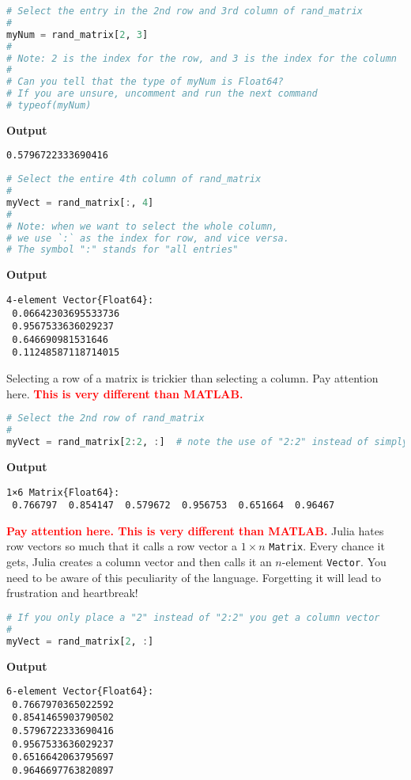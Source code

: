 \begin{lstlisting}[language=Julia,style=mystyle]
# Select the entry in the 2nd row and 3rd column of rand_matrix
#
myNum = rand_matrix[2, 3]
#
# Note: 2 is the index for the row, and 3 is the index for the column
#
# Can you tell that the type of myNum is Float64? 
# If you are unsure, uncomment and run the next command
# typeof(myNum)
\end{lstlisting}
\textbf{Output} 
\begin{verbatim}
0.5796722333690416
\end{verbatim}

\begin{lstlisting}[language=Julia,style=mystyle]
# Select the entire 4th column of rand_matrix
#
myVect = rand_matrix[:, 4]
#
# Note: when we want to select the whole column, 
# we use `:` as the index for row, and vice versa. 
# The symbol ":" stands for "all entries" 
\end{lstlisting}
\textbf{Output} 
\begin{verbatim}
4-element Vector{Float64}:
 0.06642303695533736
 0.9567533636029237
 0.646690981531646
 0.11248587118714015
\end{verbatim}

\begin{rem}
Selecting a row of a matrix is trickier than selecting a column. Pay attention here. \textcolor{red}{\bf This is very different than MATLAB.}
\end{rem}

\begin{lstlisting}[language=Julia,style=mystyle]
# Select the 2nd row of rand_matrix
#
myVect = rand_matrix[2:2, :]  # note the use of "2:2" instead of simply "2"
\end{lstlisting}
\textbf{Output} 
\begin{verbatim}
1×6 Matrix{Float64}:
 0.766797  0.854147  0.579672  0.956753  0.651664  0.96467
\end{verbatim}

\begin{rem}
\textcolor{red}{\bf Pay attention here. This is very different than MATLAB.} Julia hates row vectors so much that it calls a row vector a $1 \times n$ \texttt{Matrix}. Every chance it gets, Julia creates a column vector and then calls it an $n$-element \texttt{Vector}. You need to be aware of this peculiarity of the language. Forgetting it will lead to frustration and heartbreak! 
\end{rem}

\begin{lstlisting}[language=Julia,style=mystyle]
# If you only place a "2" instead of "2:2" you get a column vector
#
myVect = rand_matrix[2, :]
\end{lstlisting}
\textbf{Output} 
\begin{verbatim}
6-element Vector{Float64}:
 0.7667970365022592
 0.8541465903790502
 0.5796722333690416
 0.9567533636029237
 0.6516642063795697
 0.9646697763820897
\end{verbatim}


